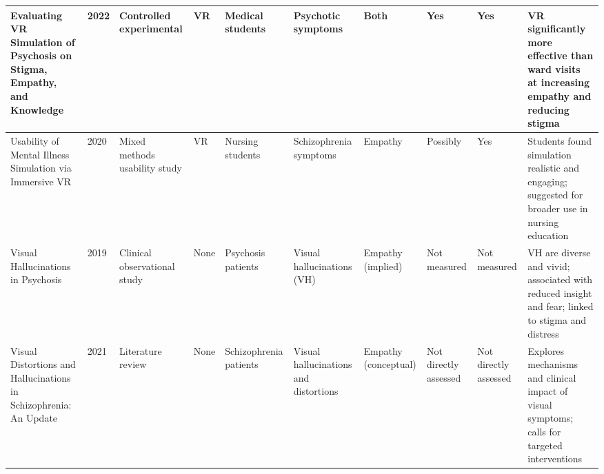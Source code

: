 \begin{landscape}
\begin{longtable}{|p{2.8cm}|p{0.6cm}|p{1.8cm}|p{1.2cm}|p{1.2cm}|p{2cm}|p{1.2cm}|p{1.2cm}|p{1.2cm}|p{3cm}|}
    \hline
    Evaluating VR Simulation of Psychosis on Stigma, Empathy, and Knowledge & 2022 & Controlled experimental & VR & Medical students & Psychotic symptoms & Both & Yes & Yes & VR significantly more effective than ward visits at increasing empathy and reducing stigma \\
    \hline
    Usability of Mental Illness Simulation via Immersive VR & 2020 & Mixed methods usability study & VR & Nursing students & Schizophrenia symptoms & Empathy & Possibly & Yes & Students found simulation realistic and engaging; suggested for broader use in nursing education \\
    \hline
    Visual Hallucinations in Psychosis & 2019 & Clinical observational study & None & Psychosis patients & Visual hallucinations (VH) & Empathy (implied) & Not measured & Not measured & VH are diverse and vivid; associated with reduced insight and fear; linked to stigma and distress \\
    \hline
    Visual Distortions and Hallucinations in Schizophrenia: An Update & 2021 & Literature review & None & Schizophrenia patients & Visual hallucinations and distortions & Empathy (conceptual) & Not directly assessed & Not directly assessed & Explores mechanisms and clinical impact of visual symptoms; calls for targeted interventions \\
    \hline
    \end{longtable}
    \end{landscape}
